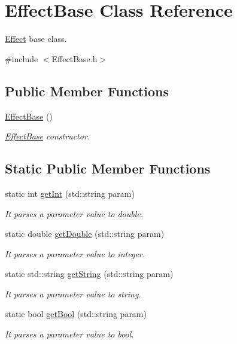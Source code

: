 \hypertarget{class_effect_base}{}\section{Effect\+Base Class Reference}
\label{class_effect_base}


\hyperlink{class_effect}{Effect} base class.  




{\ttfamily \#include $<$Effect\+Base.\+h$>$}

\subsection*{Public Member Functions}
\begin{DoxyCompactItemize}
\item 
\mbox{\label{class_effect_base_afcb5e7c5f5a689d7dc00d30eeefe5045}} 
\hyperlink{class_effect_base_afcb5e7c5f5a689d7dc00d30eeefe5045}{Effect\+Base} ()
\begin{DoxyCompactList}\small\item\em \hyperlink{class_effect_base}{Effect\+Base} constructor. \end{DoxyCompactList}\end{DoxyCompactItemize}
\subsection*{Static Public Member Functions}
\begin{DoxyCompactItemize}
\item 
static int \hyperlink{class_effect_base_aa2c8a7dfd4511cbb41f5ca1afd14cbb5}{get\+Int} (std\+::string param)
\begin{DoxyCompactList}\small\item\em It parses a parameter value to double. \end{DoxyCompactList}\item 
static double \hyperlink{class_effect_base_a29ac04c6135b4a202c0fab169f97f436}{get\+Double} (std\+::string param)
\begin{DoxyCompactList}\small\item\em It parses a parameter value to integer. \end{DoxyCompactList}\item 
static std\+::string \hyperlink{class_effect_base_a74b8d00a78daa5a33db20543564c7350}{get\+String} (std\+::string param)
\begin{DoxyCompactList}\small\item\em It parses a parameter value to string. \end{DoxyCompactList}\item 
static bool \hyperlink{class_effect_base_a5ce32d92ebf6973d177d0f8d1be8e8ba}{get\+Bool} (std\+::string param)
\begin{DoxyCompactList}\small\item\em It parses a parameter value to bool. \end{DoxyCompactList}\end{DoxyCompactItemize}
